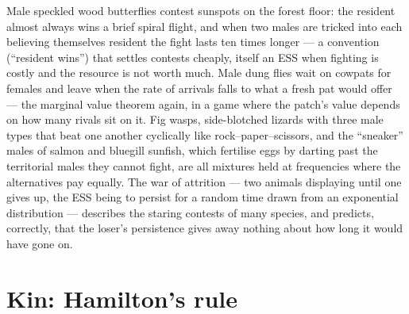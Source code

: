 \begin{example}\label{ex:b3:behavioural-ecology:games}
Male speckled wood butterflies contest sunspots on the forest floor:
the resident almost always wins a brief spiral flight, and when two
males are tricked into each believing themselves resident the fight
lasts ten times longer --- a convention (``resident wins'') that settles
contests cheaply, itself an ESS when fighting is costly and the
resource is not worth much. Male dung flies wait on cowpats for
females and leave when the rate of arrivals falls to what a fresh pat
would offer --- the marginal value theorem again, in a game where the
patch's value depends on how many rivals sit on it. Fig wasps, side-blotched
lizards with three male types that beat one another cyclically like
rock--paper--scissors, and the ``sneaker'' males of salmon and bluegill
sunfish, which fertilise eggs by darting past the territorial males
they cannot fight, are all mixtures held at frequencies where the
alternatives pay equally. The war of attrition --- two animals
displaying until one gives up, the ESS being to persist for a random
time drawn from an exponential distribution --- describes the staring
contests of many species, and predicts, correctly, that the loser's
persistence gives away nothing about how long it would have gone on.
\end{example}

\section{Kin: Hamilton's rule}


